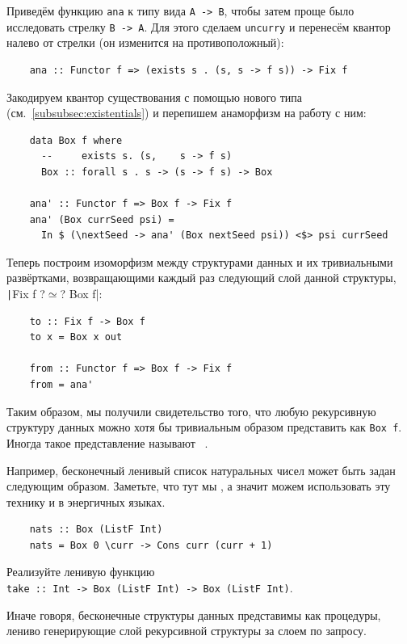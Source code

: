 Приведём функцию \texttt{ana} к типу вида \texttt{A -> B}, чтобы затем проще было исследовать стрелку \texttt{B -> A}.
Для этого сделаем \texttt{uncurry} и перенесём квантор налево от стрелки (он изменится на противоположный):
\begin{verbatim}
    ana :: Functor f => (exists s . (s, s -> f s)) -> Fix f
\end{verbatim}
Закодируем квантор существования с помощью нового типа (см.~\ref{subsubsec:existentials}) и перепишем анаморфизм на работу с ним:
\begin{verbatim}
    data Box f where
      --     exists s. (s,    s -> f s)
      Box :: forall s . s -> (s -> f s) -> Box

    ana' :: Functor f => Box f -> Fix f
    ana' (Box currSeed psi) =
      In $ (\nextSeed -> ana' (Box nextSeed psi)) <$> psi currSeed
\end{verbatim}
Теперь построим изоморфизм между структурами данных и их тривиальными развёртками, возвращающими каждый раз следующий слой данной структуры, \texttt|Fix f ?$\simeq$? Box f|:
\begin{verbatim}
    to :: Fix f -> Box f
    to x = Box x out

    from :: Functor f => Box f -> Fix f
    from = ana'
\end{verbatim}
Таким образом, мы получили свидетельство того, что любую рекурсивную структуру данных можно хотя бы тривиальным образом представить как \texttt{Box f}.
Иногда такое представление называют ~\cite{gibbons2008unfolding}.

Например, бесконечный ленивый список натуральных чисел может быть задан следующим образом.
Заметьте, что тут мы , а значит можем использовать эту технику и в энергичных языках.
\begin{verbatim}
    nats :: Box (ListF Int)
    nats = Box 0 \curr -> Cons curr (curr + 1)
\end{verbatim}

\begin{task}
    Реализуйте ленивую функцию \\ \texttt{take :: Int -> Box (ListF Int) -> Box (ListF Int)}.
\end{task}

Иначе говоря, бесконечные структуры данных представимы как процедуры, лениво генерирующие слой рекурсивной структуры за слоем по запросу.

